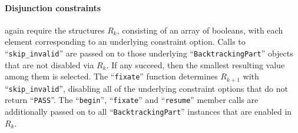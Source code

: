     \paragraph*{Disjunction constraints} again require the structures $R_k$,
    consisting of an array of booleans, with each element corresponding to an
    underlying constraint option.
    Calls to ``{\tt skip\_invalid}'' are passed on to those underlying
    ``{\tt BacktrackingPart}'' objects that are not disabled via $R_k$.
    If any succeed, then the smallest resulting value among them is selected.
    The ``{\tt fixate}'' function determines $R_{k+1}$ with
    ``{\tt skip\_invalid}'', disabling all of the underlying constraint
    options that do not return ``{\tt PASS}''.
    The ``{\tt begin}'', ``{\tt fixate}'' and ``{\tt resume}'' member
    calls are additionally passed on to all ``{\tt BacktrackingPart}'' instances
    that are enabled in $R_k$.

